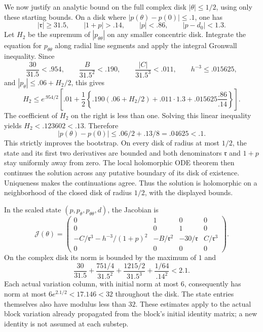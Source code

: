 We now justify an analytic bound on the full complex disk
\(|\theta|\le1/2\), using only these starting bounds.
On a disk where \(|p(\theta)-p(0)|\le.1\), one has
\[
 |\mathfrak r|\ge31.5,\qquad |1+p|>.14,\qquad
 |p|<.86,\qquad |p-d_0|<1.3.
\]
Let \(H_2\) be the supremum of \(|p_{\theta\theta}|\) on any smaller
concentric disk.  Integrate the equation for \(p_{\theta\theta}\)
along radial line segments and apply the integral Gronwall inequality.
Since
\[
 \frac{30}{31.5}<.954,\qquad
 \frac{B}{31.5^2}<.190,\qquad
 \frac{|C|}{31.5^3}<.011,\qquad h^{-3}\le.015625,
\]
and \(|p_\theta|\le .06+H_2/2\), this gives
\begin{equation}\label{cert:disk-h2}
 H_2\le
 e^{.954/2}\left[
 .01+\frac12\left\{.190(.06+H_2/2)
               +.011\cdot1.3+.015625\frac{.86}{.14}\right\}\right].
\end{equation}
The coefficient of \(H_2\) on the right is less than one.
Solving this linear inequality yields \(H_2<.123602<.13\).
Therefore
\begin{equation}\label{cert:disk-displacement}
 |p(\theta)-p(0)|\le .06/2+.13/8=.04625<.1.
\end{equation}
This strictly improves the bootstrap.  On every disk of radius at most
\(1/2\), the state and its first two derivatives are bounded and both
denominators \(\mathfrak r\) and \(1+p\) stay uniformly away from zero.
The local holomorphic ODE theorem then continues the solution across any
putative boundary of its disk of existence.  Uniqueness makes the
continuations agree.  Thus the solution is holomorphic on a neighborhood
of the closed disk of radius \(1/2\), with the displayed bounds.

In the scaled state \((p,p_\theta,p_{\theta\theta},d)\), the Jacobian is
\begin{equation}\label{cert:scaled-jacobian}
 \mathcal J(\theta)=
 \begin{pmatrix}
 0&1&0&0\\
 0&0&1&0\\
 -C/\mathfrak r^3-h^{-3}/(1+p)^2&
       -B/\mathfrak r^2&-30/\mathfrak r&C/\mathfrak r^3\\
 0&0&0&0
 \end{pmatrix}.
\end{equation}
On the complex disk its norm is bounded by the maximum of \(1\) and
\[
 \frac{30}{31.5}+\frac{751/4}{31.5^2}
       +\frac{1215/2}{31.5^3}+\frac{1/64}{.14^2}<2.1.
\]
Each actual variation column, with initial norm at most \(6\), consequently
has norm at most \(6e^{2.1/2}<17.146<32\) throughout the disk.
The state entries themselves also have modulus less than \(32\).
These estimates apply to the actual block variation already propagated
from the block's initial identity matrix; a new identity is not assumed
at each substep.

